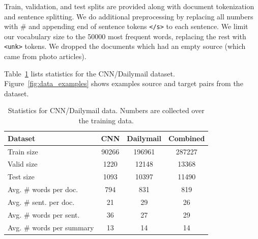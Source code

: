 \documentclass[12pt]{report}
\begin{document}
Train, validation, and test splits are provided along with document tokenization and sentence splitting. We do additional preprocessing by replacing all numbers with \# and appending end of sentence tokens \texttt{</s>} to each sentence. We limit our vocabulary size to the 50000 most frequent words, replacing the rest with \texttt{<unk>} tokens. We dropped the documents which had an empty source (which came from photo articles).

 Table~\ref{table:data_stats} lists statistics for the CNN/Dailymail dataset. Figure~\ref{fig:data_examples} shows examples source and target pairs from the dataset.



\begin{table}[h]
\centering
\begin{tabular}{lccc}
\toprule
Dataset  & CNN & Dailymail & Combined\\
\midrule
Train size & 90266 & 196961 & 287227\\
Valid size & 1220 & 12148 & 13368\\
Test size & 1093 & 10397 & 11490 \\
Avg. \# words per doc. & 794 & 831 & 819\\
Avg. \# sent. per doc. & 21 & 29 & 26\\
Avg. \# words per sent. & 36 & 27 & 29\\
Avg. \# words per summary & 13 & 14 & 14\\
\bottomrule
\end{tabular}
\caption[CNN/Dailymail Statistics]{Statistics for CNN/Dailymail data. Numbers are collected over the training data.}
\label{table:data_stats}
\end{table}
\end{document}
